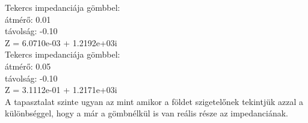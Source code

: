 Tekercs impedanciája gömbbel:\\
átmérő: 0.01 \\
távolság: -0.10 \\
Z = 6.0710e-03 + 1.2192e+03i \\

Tekercs impedanciája gömbbel:\\
átmérő: 0.05 \\
távolság: -0.10 \\
Z =  3.1112e-01 + 1.2171e+03i\\

A tapasztalat szinte ugyan az mint amikor a földet szigetelőnek tekintjük azzal a különbséggel, hogy a már a gömbnélkül is van reális része az impedanciának.